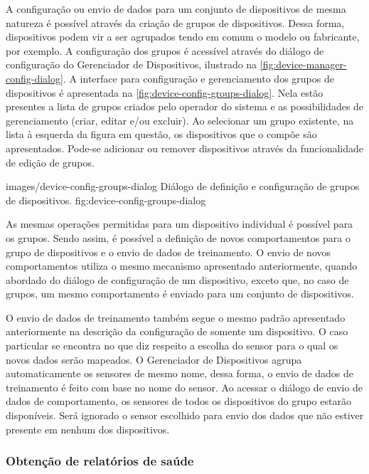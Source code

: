 A configuração ou envio de dados para um conjunto de dispositivos de mesma natureza é possível
através da criação de grupos de dispositivos. Dessa forma, dispositivos podem vir a ser agrupados
tendo em comum o modelo ou fabricante, por exemplo. A configuração dos grupos é acessível através do
diálogo de configuração do Gerenciador de Dispositivos, ilustrado na
\cref{fig:device-manager-config-dialog}. A interface para configuração e gerenciamento dos grupos de
dispositivos é apresentada na \cref{fig:device-config-groups-dialog}. Nela estão presentes a lista
de grupos criados pelo operador do sistema e as possibilidades de gerenciamento (criar, editar e/ou
excluir). Ao selecionar um grupo existente, na lista à esquerda da figura em questão, os
dispositivos que o compõe são apresentados. Pode-se adicionar ou remover dispositivos através da
funcionalidade de edição de grupos.

  {images/device-config-groups-dialog}
  {Diálogo de definição e configuração de grupos de dispositivos.}
  {fig:device-config-groups-dialog}

As mesmas operações permitidas para um dispositivo individual é possível para os grupos. Sendo
assim, é possível a definição de novos comportamentos para o grupo de dispositivos e o envio de
dados de treinamento. O envio de novos comportamentos utiliza o mesmo mecanismo apresentado
anteriormente, quando abordado do diálogo de configuração de um dispositivo, exceto que, no caso de
grupos, um mesmo comportamento é enviado para um conjunto de dispositivos.


O envio de dados de treinamento também segue o mesmo padrão apresentado anteriormente na descrição
da configuração de somente um dispositivo. O caso particular se encontra no que diz respeito a
escolha do sensor para o qual os novos dados serão mapeados. O Gerenciador de Dispositivos agrupa
automaticamente os sensores de mesmo nome, dessa forma, o envio de dados de treinamento é feito com
base no nome do sensor. Ao acessar o diálogo de envio de dados de comportamento, os sensores de
todos os dispositivos do grupo estarão disponíveis. Será ignorado o sensor escolhido para envio dos
dados que não estiver presente em nenhum dos dispositivos.


\subsubsection{Obtenção de relatórios de saúde}

